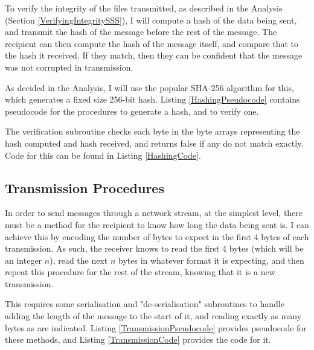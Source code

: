 \documentclass[../main.tex]{subfiles}
\begin{document}
To verify the integrity of the files transmitted, as described in the Analysis (Section \ref{VerifyingIntegritySSS}), I will compute a hash of the data being sent, and transmit the hash of the message before the rest of the message. The recipient can then compute the hash of the message itself, and compare that to the hash it received. If they match, then they can be confident that the message was not corrupted in transmission.

As decided in the Analysis, I will use the popular SHA-256 algorithm for this, which generates a fixed size 256-bit hash. Listing \ref{HashingPseudocode} contains pseudocode for the procedures to generate a hash, and to verify one.

\FloatBarrier

\FloatBarrier

The verification subroutine checks each byte in the byte arrays representing the hash computed and hash received, and returns false if any do not match exactly. Code for this can be found in Listing \ref{HashingCode}.

\FloatBarrier

\FloatBarrier

\subsection{Transmission Procedures}

In order to send messages through a network stream, at the simplest level, there must be a method for the recipient to know how long the data being sent is. I can achieve this by encoding the number of bytes to expect in the first 4 bytes of each transmission. As such, the receiver knows to read the first 4 bytes (which will be an integer $n$), read the next $n$ bytes in whatever format it is expecting, and then repeat this procedure for the rest of the stream, knowing that it is a new transmission.

This requires some serialisation and "de-serialisation" subroutines to handle adding the length of the message to the start of it, and reading exactly as many bytes as are indicated. Listing \ref{TransmissionPseudocode} provides pseudocode for these methods, and Listing \ref{TransmissionCode} provides the code for it.

\FloatBarrier

\FloatBarrier
\end{document}
